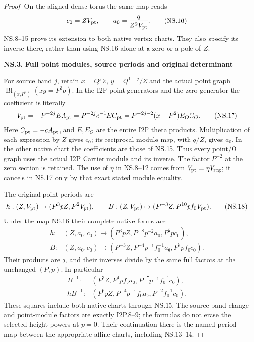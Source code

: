 \begin{proof}
On the aligned dense torus the same map reads
\[
                    c_0=ZV_{\rm pt},\qquad
                    a_0=\frac{q}{Z^2V_{\rm pt}}.
 \tag{NS.16}
\]
NS.8--15 prove its extension to both native vertex charts. They also
specify its inverse there, rather than using NS.16 alone at a zero
or a pole of \(Z\).

\par

\medskip\noindent\textbf{NS.3. Full point modules, source periods and original determinant}

\par\nobreak

For source band \(j\), retain \(x=Q^jZ\),
\(y=Q^{1-j}/Z\) and the actual point graph
\(\operatorname{Bl}_{(x,P^2)}(xy=P^3p)\). In the I2P point
generators and the zero generator the coefficient is literally
\[
 V_{\rm pt}=-P^{-2j}E A_{\rm pt}
 =P^{-2j}c^{-1}E C_{\rm pt}
 =P^{-2j-2}(x-P^2)E_OC_O.
 \tag{NS.17}
\]
Here \(C_{\rm pt}=-cA_{\rm pt}\), and \(E,E_O\) are the entire
I2P theta products. Multiplication of each expression by \(Z\)
gives \(c_0\); its reciprocal module map, with \(q/Z\), gives
\(a_0\). In the other native chart the coefficients are those of
NS.15. Thus every point/O graph uses the actual I2P Cartier module
and its inverse. The factor \(P^{-2}\) at the zero section is
retained. The use of \(\eta\) in NS.8--12 comes from
\(V_{\rm pt}=\eta V_{\rm reg}\); it cancels in NS.17 only by that
exact stated module equality.

The original point periods are
\[
 h:(Z,V_{\rm pt})\mapsto(P^3pZ,P^2V_{\rm pt}),\qquad
 B:(Z,V_{\rm pt})\mapsto(P^{-3}Z,P^{10}pf_0V_{\rm pt}).
 \tag{NS.18}
\]
Under the map NS.16 their complete native forms are
\[
 \begin{aligned}
 h:&(Z,a_0,c_0)\mapsto
 (P^3pZ,P^{-8}p^{-2}a_0,P^5p c_0),\\
 B:&(Z,a_0,c_0)\mapsto
 (P^{-3}Z,P^{-4}p^{-1}f_0^{-1}a_0,P^7pf_0c_0).
 \end{aligned}\tag{NS.19}
\]
Their products are \(q\), and their inverses divide by the same
full factors at the unchanged \((P,p)\). In particular
\[
 \begin{aligned}
 B^{-1}:&(P^3Z,P^4pf_0a_0,P^{-7}p^{-1}f_0^{-1}c_0),\\
 hB^{-1}:&(P^6pZ,P^{-4}p^{-1}f_0a_0,P^{-2}f_0^{-1}c_0).
 \end{aligned}\tag{NS.20}
\]
These squares include both native charts through NS.15. The
source-band change and point-module factors are exactly I2P.8--9;
the formulas do not erase the selected-height powers at \(p=0\).
Their continuation there is the named period map between the
appropriate affine charts, including NS.13--14.


\end{proof}
